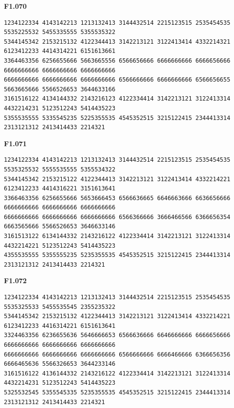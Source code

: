 \noindent\begin{minipage}{\linewidth}\textbf{F1.070}
\begin{lstlisting}
1234122334 4143142213 1213132413 3144432514 2215123515 2535454535 5535225532 5455335555 5355535322
5344145342 2153215132 4122344413 3142213121 3122413414 4332214321 6123412233 4414314221 6151613661
3364463356 6256655666 5663665556 6566656666 6666666666 6666656666 6666666666 6666666666 6666666666
6666666666 6666666666 6666666666 6566666666 6666666666 6566656655 5663665666 5566526653 3644633166
3161516122 4134144332 2143216123 4122334414 3142213121 3122413314 4432214231 5123512243 5414435223
5355535555 5335545235 5225355535 4545352515 3215122415 2344413314 2313121312 2413414433 2214321
\end{lstlisting}
\end{minipage}\par\smallskip

\noindent\begin{minipage}{\linewidth}\textbf{F1.071}
\begin{lstlisting}
1234122334 4143142213 1213132413 3144432514 2215123515 2535454535 5535325532 5555535555 5355534322
5344145342 2153215122 4122344413 3142213121 3122413414 4332214221 6123412233 4414316221 3151613641
3366463356 6256655666 5653666453 6566636665 6646663666 6636656666 6666666666 6666666666 6666666666
6666666666 6666666666 6666666666 6566366666 3666466566 6366656354 6663565666 5566526653 3646633146
3161513122 6134144332 2143216122 4122334414 3142213121 3122413314 4432214221 5123512243 5414435223
4355535555 5355555235 5235355535 4545352515 3215122415 2344413314 2313121312 2413414433 2214321
\end{lstlisting}
\end{minipage}\par\smallskip

\noindent\begin{minipage}{\linewidth}\textbf{F1.072}
\begin{lstlisting}
1234122334 4143142213 1213132413 3144432514 2215123515 2535454535 5535325533 5455535545 2355235322
5344145342 2153215132 4122344413 3142213121 3122413414 4332214221 6123412233 4416314221 6151613641
3324463356 6236655636 5646666653 6566636666 6646666666 6666656666 6666666666 6666666666 6666666666
6666666666 6666666666 6666666666 6566666666 6666466666 6366656356 6666465636 5566326653 3644233146
3161516122 4136144332 2143216122 4122334414 3142213121 3122413314 4432214231 5123512243 5414435223
5325532545 5355545335 5235355535 4545352515 3215122415 2344413314 2313121312 2413414433 2214321
\end{lstlisting}
\end{minipage}\par\smallskip

